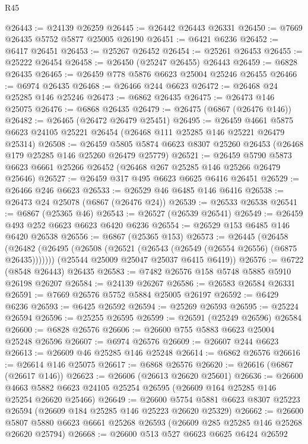 \begin{lexlean}{R45}
\begin{coremodule}
{@26443 := @24139 @26259
@26445 := @26442 @26443 @26331
@26450 := @7669 @26435 @5752 @5877 @25005 @26190
@26451 := @6421 @6236
@26452 := @6417 @26451
@26453 := @25267 @26452
@26454 := @25261 @26453
@26455 := @25222 @26454
@26458 := @26450 (@25247 @26455) @26443
@26459 := @6828 @26435
@26465 := @26459 @778 @5876 @6623 @25004 @25246 @26455
@26466 := @6974 @26435
@26468 := @26466 @244 @6623
@26472 := @26468 @24 @25285 @146 @25246
@26473 := @6862 @26435
@26475 := @26473 @146 @25075
@26476 := @6868 @26435
@26479 := @26475 (@6867 (@26476 @146))
@26482 := @26465 (@26472 @26479 @25451)
@26495 := @26459
    @4661
    @5875
    @6623
    @24105
    @25221
    @26454
    (@26468 @111 @25285 @146 @25221 @26479 @25314)
@26508 := @26459
    @5805
    @5874
    @6623
    @8307
    @25260
    @26453
    (@26468 @179 @25285 @146 @25260 @26479 @25779)
@26521 := @26459
    @5790
    @5873
    @6623
    @6661
    @25266
    @26452
    (@26468 @267 @25285 @146 @25266 @26479 @25646)
@26527 := @26459 @317 @495 @6623 @6625 @6416 @26451
@26529 := @26466 @246 @6623
@26533 := @26529 @46 @6485 @146 @6416
@26538 := @26473 @24 @25078 (@6867 (@26476 @24))
@26539 := @26533 @26538
@26541 := @6867 (@25365 @46)
@26543 := @26527 (@26539 @26541)
@26549 := @26459 @493 @252 @6623 @6623 @6420 @6236
@26554 := @26529 @153 @6485 @146 @6420 @26538
@26556 := @6867 (@25365 @153)
@26573 := @26445
    (@26458
      (@26482 (@26495 (@26508 (@26521 (@26543 (@26549 (@26554 @26556) (@6875 @26435)))))))
      (@25544 @25009 @25047 @25037 @6415 @6419))
@26576 := @6722 (@8548 @26443) @26435
@26583 := @7482 @26576 @158 @5748 @5885 @5910 @26198 @26207
@26584 := @24139 @26267
@26586 := @26583 @26584 @26331
@26591 := @7669 @26576 @5752 @5884 @25005 @26197
@26592 := @6429 @6236
@26593 := @6425 @26592
@26594 := @25269 @26593
@26595 := @25224 @26594
@26596 := @25255 @26595
@26599 := @26591 (@25249 @26596) @26584
@26600 := @6828 @26576
@26606 := @26600 @755 @5883 @6623 @25004 @25248 @26596
@26607 := @6974 @26576
@26609 := @26607 @244 @6623
@26613 := @26609 @46 @25285 @146 @25248
@26614 := @6862 @26576
@26616 := @26614 @146 @25075
@26617 := @6868 @26576
@26620 := @26616 (@6867 (@26617 @146))
@26623 := @26606 (@26613 @26620 @25601)
@26636 := @26600
    @4663
    @5882
    @6623
    @24105
    @25254
    @26595
    (@26609 @164 @25285 @146 @25254 @26620 @25466)
@26649 := @26600
    @5754
    @5881
    @6623
    @8307
    @25223
    @26594
    (@26609 @184 @25285 @146 @25223 @26620 @25329)
@26662 := @26600
    @5807
    @5880
    @6623
    @6661
    @25268
    @26593
    (@26609 @285 @25285 @146 @25268 @26620 @25794)
@26668 := @26600 @513 @527 @6623 @6625 @6424 @26592
}
\end{coremodule}
\end{lexlean}
